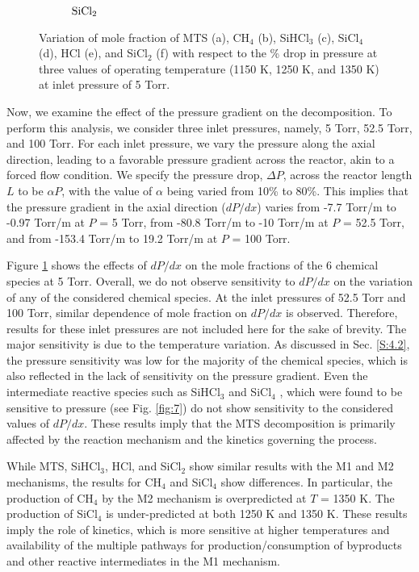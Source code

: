 \documentclass[final, letterpaper, square, comma, numbers, sort&compress]{elsarticle}
\begin{document}
\begin{figure}
\begin{subfigure}{0.49\textwidth}
        \caption{$\rm SiCl_2$}
    \end{subfigure}
     \caption{Variation of mole fraction of MTS (a), CH$_4$ (b), SiHCl$_3$ (c), SiCl$_4$ (d), HCl (e), and SiCl$_2$ (f) with respect to the \% drop in pressure at three values of operating temperature (1150 K, 1250 K, and 1350 K) at inlet pressure of 5 Torr.}
     \label{fig:10}
\end{figure}

Now, we examine the effect of the pressure gradient on the decomposition. To perform this analysis, we consider three inlet pressures, namely, 5 Torr, 52.5 Torr, and 100 Torr. For each inlet pressure, we vary the pressure along the axial direction, leading to a favorable pressure gradient across the reactor, akin to a forced flow condition. We specify the pressure drop, $\Delta P$, across the reactor length $L$ to be $\alpha P$, with the value of $\alpha$ being varied from 10\% to 80\%. This implies that the pressure gradient in the axial direction ($dP/dx$) varies from -7.7 Torr/m to -0.97 Torr/m at $P$ = 5 Torr, from -80.8 Torr/m to -10 Torr/m at $P$ = 52.5 Torr, and from -153.4 Torr/m to 19.2 Torr/m at $P$ = 100 Torr.

Figure \ref{fig:10} shows the effects of $dP/dx$ on the mole fractions of the 6 chemical species at 5 Torr. Overall, we do not observe sensitivity to $dP/dx$ on the variation of any of the considered chemical species. At the inlet pressures of 52.5 Torr and 100 Torr, similar dependence of mole fraction on $dP/dx$ is observed. Therefore, results for these inlet pressures are not included here for the sake of brevity. The major sensitivity is due to the temperature variation. As discussed in Sec. \ref{S:4.2}, the pressure sensitivity was low for the majority of the chemical species, which is also reflected in the lack of sensitivity on the pressure gradient. Even the intermediate reactive species such as SiHCl$_3$ and SiCl$_4$ , which were found to be sensitive to pressure (see Fig. \ref{fig:7}) do not show sensitivity to the considered values of $dP/dx$. These results imply that the MTS decomposition is primarily affected by the reaction mechanism and the kinetics governing the process. 

While MTS, SiHCl$_3$, HCl, and SiCl$_2$ show similar results with the M1 and M2 mechanisms, the results for CH$_4$ and SiCl$_4$ show differences. In particular, the production of CH$_4$ by the M2 mechanism is overpredicted at $T$ = 1350 K. The production of SiCl$_4$ is under-predicted at both 1250 K and 1350 K. These results imply the role of kinetics, which is more sensitive at higher temperatures and availability of the multiple pathways for production/consumption of byproducts and other reactive intermediates in the M1 mechanism.
\end{document}
